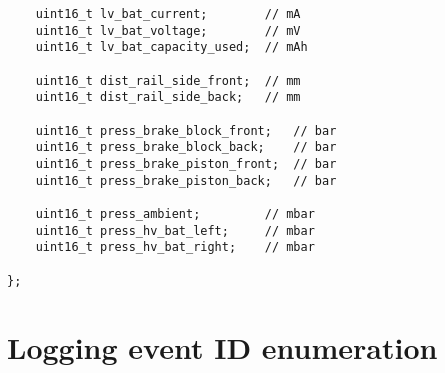 \begin{verbatim}
    uint16_t lv_bat_current;        // mA
    uint16_t lv_bat_voltage;        // mV
    uint16_t lv_bat_capacity_used;  // mAh

    uint16_t dist_rail_side_front;  // mm
    uint16_t dist_rail_side_back;   // mm

    uint16_t press_brake_block_front;   // bar
    uint16_t press_brake_block_back;    // bar
    uint16_t press_brake_piston_front;  // bar
    uint16_t press_brake_piston_back;   // bar

    uint16_t press_ambient;         // mbar
    uint16_t press_hv_bat_left;     // mbar
    uint16_t press_hv_bat_right;    // mbar

};
\end{verbatim}

\chapter{Logging event ID enumeration} \label{log_event}

